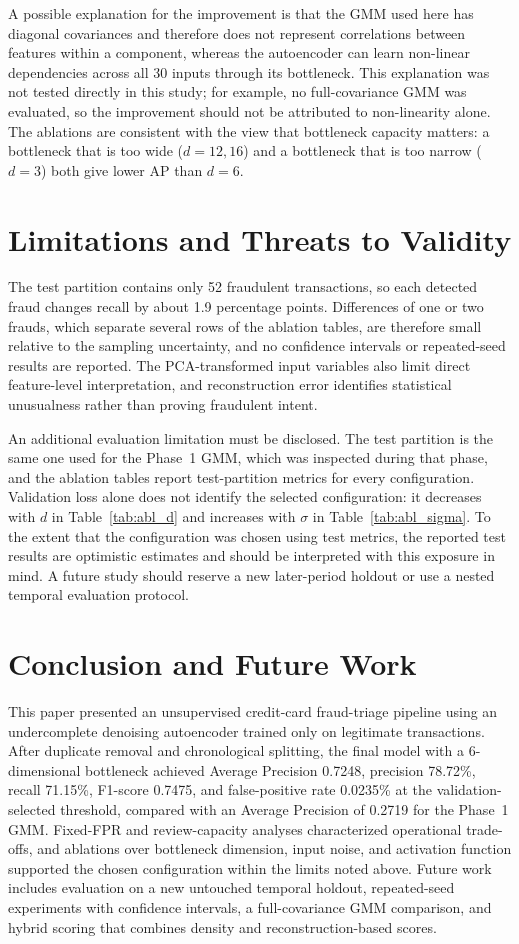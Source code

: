 \documentclass[conference]{IEEEtran}
\begin{document}
A possible explanation for the improvement is that the GMM used here has diagonal covariances and therefore does not represent correlations between features within a component, whereas the autoencoder can learn non-linear dependencies across all 30 inputs through its bottleneck. This explanation was not tested directly in this study; for example, no full-covariance GMM was evaluated, so the improvement should not be attributed to non-linearity alone. The ablations are consistent with the view that bottleneck capacity matters: a bottleneck that is too wide ($d=12,16$) and a bottleneck that is too narrow ($d=3$) both give lower AP than $d=6$.

\section{Limitations and Threats to Validity}
The test partition contains only 52 fraudulent transactions, so each detected fraud changes recall by about 1.9 percentage points. Differences of one or two frauds, which separate several rows of the ablation tables, are therefore small relative to the sampling uncertainty, and no confidence intervals or repeated-seed results are reported. The PCA-transformed input variables also limit direct feature-level interpretation, and reconstruction error identifies statistical unusualness rather than proving fraudulent intent.

An additional evaluation limitation must be disclosed. The test partition is the same one used for the Phase~1 GMM, which was inspected during that phase, and the ablation tables report test-partition metrics for every configuration. Validation loss alone does not identify the selected configuration: it decreases with $d$ in Table~\ref{tab:abl_d} and increases with $\sigma$ in Table~\ref{tab:abl_sigma}. To the extent that the configuration was chosen using test metrics, the reported test results are optimistic estimates and should be interpreted with this exposure in mind. A future study should reserve a new later-period holdout or use a nested temporal evaluation protocol.

\section{Conclusion and Future Work}
This paper presented an unsupervised credit-card fraud-triage pipeline using an undercomplete denoising autoencoder trained only on legitimate transactions. After duplicate removal and chronological splitting, the final model with a 6-dimensional bottleneck achieved Average Precision 0.7248, precision 78.72\%, recall 71.15\%, F1-score 0.7475, and false-positive rate 0.0235\% at the validation-selected threshold, compared with an Average Precision of 0.2719 for the Phase~1 GMM. Fixed-FPR and review-capacity analyses characterized operational trade-offs, and ablations over bottleneck dimension, input noise, and activation function supported the chosen configuration within the limits noted above. Future work includes evaluation on a new untouched temporal holdout, repeated-seed experiments with confidence intervals, a full-covariance GMM comparison, and hybrid scoring that combines density and reconstruction-based scores.
\end{document}
